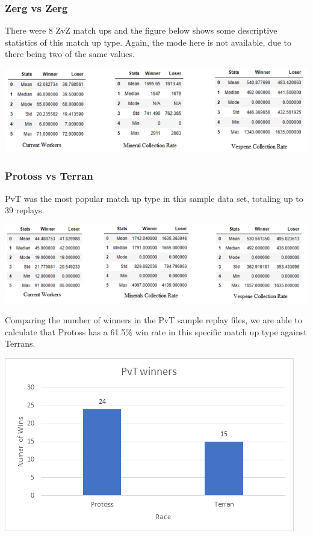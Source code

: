 \documentclass[a4paper,12pt]{report}
\begin{document}
\subsubsection{Zerg vs Zerg}
There were 8 ZvZ match ups and the figure below shows some descriptive statistics of this match up type. Again, the mode here is not available, due to there being two of the same values. 

\begin{center}
    \captionsetup{type=figure}
    \includegraphics[width=.9\linewidth]{media/WorkersCollectionZvZ.png}
\end{center}

\subsubsection{Protoss vs Terran}
PvT was the most popular match up type in this sample data set, totaling up to 39 replays.

\begin{center}
    \captionsetup{type=figure}
    \includegraphics[width=.9\linewidth]{media/TerranWinnervsLoser.png}
\end{center}

Comparing the number of winners in the PvT sample replay files, we are able to calculate that Protoss has a 61.5\% win rate in this specific match up type against Terrans.

\begin{center}
    \captionsetup{type=figure}
    \includegraphics[width=.9\linewidth]{media/PvTwinrate.png}
\end{center}
\end{document}
